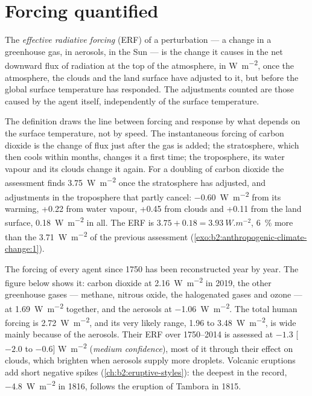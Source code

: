 \section{Forcing quantified}\label{sec:b2:anthropogenic-climate-change:forcing}

\begin{definition}\label{def:b2:anthropogenic-climate-change:erf}
The \emph{effective radiative forcing} (ERF) of a perturbation
--- a change in a greenhouse gas, in aerosols, in the Sun --- is the change it causes in the net
downward flux of radiation at the top of the atmosphere, in \unit{W.m^{-2}}, once the atmosphere,
the clouds and the land surface have adjusted to it, but before the global surface temperature
has responded. The adjustments counted are those caused by the agent itself, independently of the
surface temperature.
\end{definition}

The definition draws the line between forcing and response by what depends on the surface
temperature, not by speed. The instantaneous forcing of carbon dioxide is the change of flux just
after the gas is added; the stratosphere, which then cools within months, changes it a first time;
the troposphere, its water vapour and its clouds change it again. For a doubling of carbon
dioxide the assessment finds \qty{3.75}{W.m^{-2}} once the stratosphere has adjusted, and
adjustments in the troposphere that partly cancel: \qty{-0.60}{W.m^{-2}} from its warming, +0.22
from water vapour, +0.45 from clouds and +0.11 from the land surface, \qty{+0.18}{W.m^{-2}} in all.
The ERF is $3.75 + 0.18 = \qty{3.93}{W.m^{-2}}$, \qty{6}{\percent} more than the
\qty{3.71}{W.m^{-2}} of the previous assessment (\cref{exo:b2:anthropogenic-climate-change:1}).

The forcing of every agent since 1750 has been reconstructed year by year. The figure below shows
it: carbon dioxide at \qty{2.16}{W.m^{-2}} in 2019, the other greenhouse gases --- methane,
nitrous oxide, the halogenated gases and ozone --- at \qty{1.69}{W.m^{-2}} together, and the
aerosols at \qty{-1.06}{W.m^{-2}}. The total human forcing is \qty{2.72}{W.m^{-2}}, and its very
likely range, 1.96 to \qty{3.48}{W.m^{-2}}, is wide mainly because of the aerosols. Their ERF over
1750--2014 is assessed at $-1.3$ [$-2.0$ to $-0.6$] \unit{W.m^{-2}} (\emph{medium confidence}),
most of it through their effect on clouds, which brighten when aerosols supply more droplets.
Volcanic eruptions add short negative spikes (\cref{ch:b2:eruptive-styles}): the deepest in the
record, \qty{-4.8}{W.m^{-2}} in 1816, follows the eruption of Tambora in 1815.

